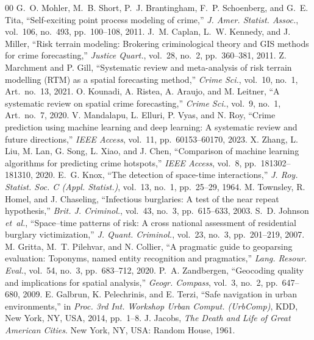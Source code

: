 \documentclass[conference]{IEEEtran}
\begin{document}
\begin{thebibliography}{00}
 G.~O. Mohler, M.~B. Short, P.~J. Brantingham, F.~P. Schoenberg, and G.~E. Tita, ``Self-exciting point process modeling of crime,'' \emph{J. Amer. Statist. Assoc.}, vol.~106, no.~493, pp.~100--108, 2011.
 J.~M. Caplan, L.~W. Kennedy, and J. Miller, ``Risk terrain modeling: Brokering criminological theory and GIS methods for crime forecasting,'' \emph{Justice Quart.}, vol.~28, no.~2, pp.~360--381, 2011.
 Z. Marchment and P. Gill, ``Systematic review and meta-analysis of risk terrain modelling (RTM) as a spatial forecasting method,'' \emph{Crime Sci.}, vol.~10, no.~1, Art.~no.~13, 2021.
 O. Kounadi, A. Ristea, A. Araujo, and M. Leitner, ``A systematic review on spatial crime forecasting,'' \emph{Crime Sci.}, vol.~9, no.~1, Art.~no.~7, 2020.
 V. Mandalapu, L. Elluri, P. Vyas, and N. Roy, ``Crime prediction using machine learning and deep learning: A systematic review and future directions,'' \emph{IEEE Access}, vol.~11, pp.~60153--60170, 2023.
 X. Zhang, L. Liu, M. Lan, G. Song, L. Xiao, and J. Chen, ``Comparison of machine learning algorithms for predicting crime hotspots,'' \emph{IEEE Access}, vol.~8, pp.~181302--181310, 2020.
 E.~G. Knox, ``The detection of space-time interactions,'' \emph{J. Roy. Statist. Soc. C (Appl. Statist.)}, vol.~13, no.~1, pp.~25--29, 1964.
 M. Townsley, R. Homel, and J. Chaseling, ``Infectious burglaries: A test of the near repeat hypothesis,'' \emph{Brit. J. Criminol.}, vol.~43, no.~3, pp.~615--633, 2003.
 S.~D. Johnson \emph{et~al.}, ``Space--time patterns of risk: A cross national assessment of residential burglary victimization,'' \emph{J. Quant. Criminol.}, vol.~23, no.~3, pp.~201--219, 2007.
 M. Gritta, M.~T. Pilehvar, and N. Collier, ``A pragmatic guide to geoparsing evaluation: Toponyms, named entity recognition and pragmatics,'' \emph{Lang. Resour. Eval.}, vol.~54, no.~3, pp.~683--712, 2020.
 P.~A. Zandbergen, ``Geocoding quality and implications for spatial analysis,'' \emph{Geogr. Compass}, vol.~3, no.~2, pp.~647--680, 2009.
 E. Galbrun, K. Pelechrinis, and E. Terzi, ``Safe navigation in urban environments,'' in \emph{Proc. 3rd Int. Workshop Urban Comput. (UrbComp)}, KDD, New York, NY, USA, 2014, pp.~1--8.
 J. Jacobs, \emph{The Death and Life of Great American Cities}. New York, NY, USA: Random House, 1961.

\end{thebibliography}
\end{document}
